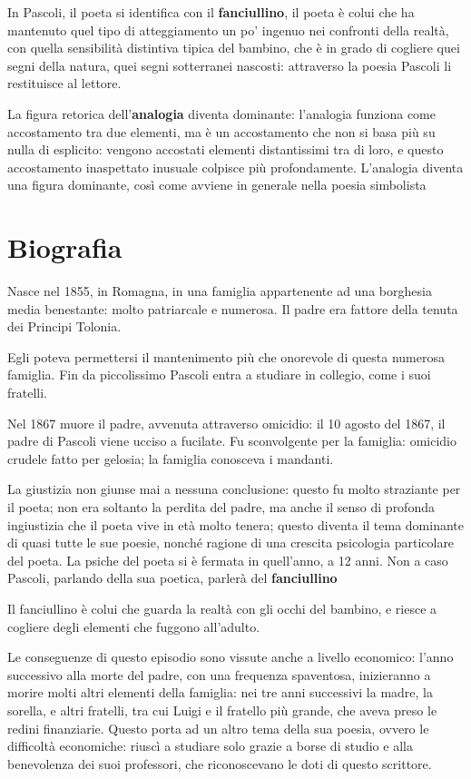 \documentclass[a4paper, twoside, titlepage]{book}
\begin{document}
In Pascoli, il poeta si identifica con il \textbf{fanciullino}, il poeta è colui che ha mantenuto quel tipo di atteggiamento un po' ingenuo nei confronti della realtà, con quella sensibilità distintiva tipica del bambino, che è in grado di cogliere quei segni della natura, quei segni sotterranei nascosti: attraverso la poesia Pascoli li restituisce al lettore.

La figura retorica dell'\textbf{analogia} diventa dominante: l'analogia funziona come accostamento tra due elementi, ma è un accostamento che non si basa più su nulla di esplicito: vengono accostati elementi distantissimi tra di loro, e questo accostamento inaspettato inusuale colpisce più profondamente.
L'analogia diventa una figura dominante, così come avviene in generale nella poesia simbolista


\section{Biografia}

Nasce nel 1855, in Romagna, in una famiglia appartenente ad una borghesia media benestante: molto patriarcale e numerosa. Il padre era fattore della tenuta dei Principi Tolonia.

Egli poteva permettersi il mantenimento più che onorevole di questa numerosa famiglia.
Fin da piccolissimo Pascoli entra a studiare in collegio, come i suoi fratelli.

Nel 1867 muore il padre, avvenuta attraverso omicidio: il 10 agosto del 1867, il padre di Pascoli viene ucciso a fucilate. Fu sconvolgente per la famiglia: omicidio crudele fatto per gelosia; la famiglia conosceva i mandanti.

La giustizia non giunse mai a nessuna conclusione: questo fu molto straziante per il poeta; non era soltanto la perdita del padre, ma anche il senso di profonda ingiustizia che il poeta vive in età molto tenera; questo diventa il tema dominante di quasi tutte le sue poesie, nonché ragione di una crescita psicologia particolare del poeta. La psiche del poeta si è fermata in quell'anno, a 12 anni.
Non a caso Pascoli, parlando della sua poetica, parlerà del \textbf{fanciullino}

Il fanciullino è colui che guarda la realtà con gli occhi del bambino, e riesce a cogliere degli elementi che fuggono all'adulto.

Le conseguenze di questo episodio sono vissute anche a livello economico: l'anno successivo alla morte del padre, con una frequenza spaventosa, inizieranno a morire molti altri elementi della famiglia: nei tre anni successivi la madre, la sorella, e altri fratelli, tra cui Luigi e il fratello più grande, che aveva preso le redini finanziarie.
Questo porta ad un altro tema della sua poesia, ovvero le difficoltà economiche: riuscì a studiare solo grazie a borse di studio e alla benevolenza dei suoi professori, che riconoscevano le doti di questo scrittore.
\end{document}

